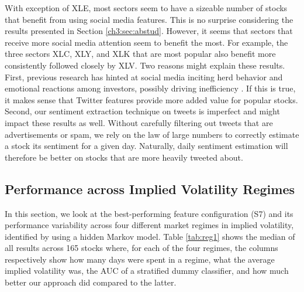 \documentclass[preprint,1p, times,authoryear]{elsarticle}
\begin{document}
With exception of XLE, most sectors seem to have a sizeable number of stocks that benefit from using social media features. This is no surprise considering the results presented in Section \ref{ch3:sec:abstud}. However, it seems that sectors that receive more social media attention seem to benefit the most. For example, the three sectors XLC, XLY, and XLK that are most popular also benefit more consistently followed closely by XLV. Two reasons might explain these results. First, previous research has hinted at social media inciting herd behavior and emotional reactions among investors, possibly driving inefficiency \citep[e.g.][]{herding, Oliveira2017, GROKLUMANN2019171}. If this is true, it makes sense that Twitter features provide more added value for popular stocks. Second, our sentiment extraction technique on tweets is imperfect and might impact these results as well. Without carefully filtering out tweets that are advertisements or spam, we rely on the law of large numbers to correctly estimate a stock its sentiment for a given day. Naturally, daily sentiment estimation will therefore be better on stocks that are more heavily tweeted about. 

\subsection {Performance across Implied Volatility Regimes}
\label{ch3:sec:regim}

In this section, we look at the best-performing feature configuration (S7) and its performance variability across four different market regimes in implied volatility, identified by using a hidden Markov model. Table \ref{tab:reg1} shows the median of all results across 165 stocks where, for each of the four regimes, the columns respectively show how many days were spent in a regime, what the average implied volatility was, the AUC of a stratified dummy classifier, and how much better our approach did compared to the latter. 
\end{document}
